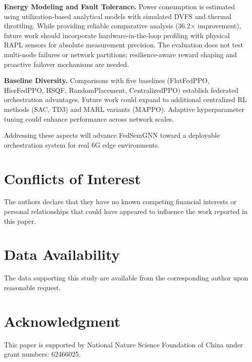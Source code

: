 \documentclass[conference]{IEEEtran}
\begin{document}
		\textbf{Energy Modeling and Fault Tolerance.} Power consumption is estimated using utilization-based analytical models with simulated DVFS and thermal throttling. While providing reliable comparative analysis (36.2$\times$ improvement), future work should incorporate hardware-in-the-loop profiling with physical RAPL sensors for absolute measurement precision. The evaluation does not test multi-node failures or network partitions; resilience-aware reward shaping and proactive failover mechanisms are needed.
		
		\textbf{Baseline Diversity.} Comparisons with five baselines (FlatFedPPO, HierFedPPO, HSQF, RandomPlacement, CentralizedPPO) establish federated orchestration advantages. Future work could expand to additional centralized RL methods (SAC, TD3) and MARL variants (MAPPO). Adaptive hyperparameter tuning could enhance performance across network scales.
		
		Addressing these aspects will advance FedSemGNN toward a deployable orchestration system for real 6G edge environments.
		
		
		
		\section*{Conflicts of Interest}
		The authors declare that they have no known competing financial interests or personal relationships that could have appeared to influence the work reported in this paper.
		
		\section*{Data Availability}
		The data supporting this study are available from the corresponding author upon reasonable request.
		
		\section*{Acknowledgment}
		This paper is supported by National Nature Science Foundation of China under grant numbers: 62466025.
		
		
		
		
		
	
\end{document}
